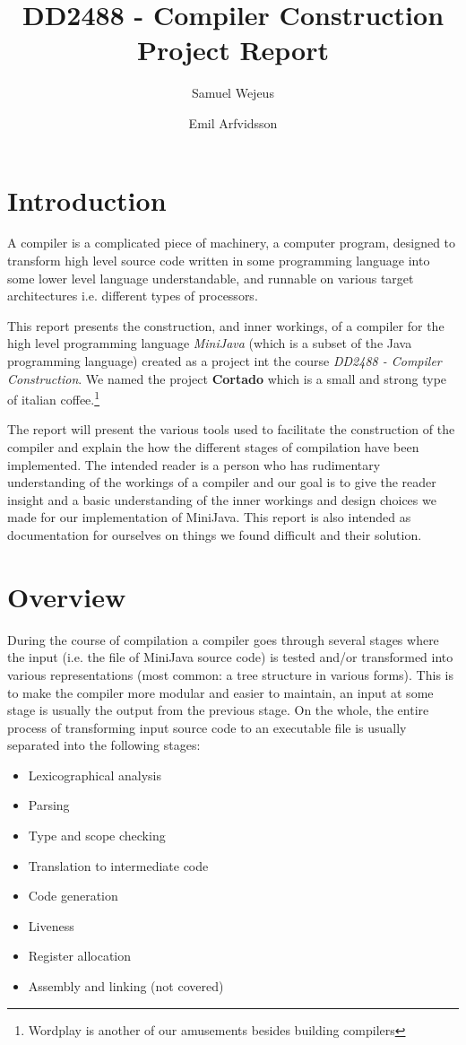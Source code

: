 \documentclass[11pt]{amsart}
\title{DD2488 - Compiler Construction\\Project Report}
\author{Samuel Wejeus \and Emil Arfvidsson}
\begin{document}
\maketitle

\section{Introduction}
A compiler is a complicated piece of machinery, a computer program, designed to transform high level source code written in some programming language into some lower level language understandable, and runnable on various target architectures i.e. different types of processors.

This report presents the construction, and inner workings, of a compiler for the high level programming language \textit{MiniJava} (which is a subset of the Java programming language) created as a project int the course \textit{DD2488 - Compiler Construction}\cite{appel}. We named the project \textbf{Cortado} which is a small and strong type of italian coffee.\footnote{Wordplay is another of our amusements besides building compilers}

The report will present the various tools used to facilitate the construction of the compiler and explain the how the different stages of compilation have been implemented. The intended reader is a person who has rudimentary understanding of the workings of a compiler and our goal is to give the reader insight and a basic understanding of the inner workings and design choices we made for our implementation of MiniJava. This report is also intended as documentation for ourselves on things we found difficult and their solution.

\section{Overview}
During the course of compilation a compiler goes through several stages where the input (i.e. the file of MiniJava source code) is tested and/or transformed into various representations (most common: a tree structure in various forms). This is to make the compiler more modular and easier to maintain, an input at some stage is usually the output from the previous stage. On the whole, the entire process of transforming input source code to an executable file is usually separated into the following stages:

\begin{itemize}
\item Lexicographical analysis
\item Parsing
\item Type and scope checking
\item Translation to intermediate code
\item Code generation
\item{Liveness}
\item{Register allocation}
\item Assembly and linking (not covered)
\end{itemize}
\end{document}
